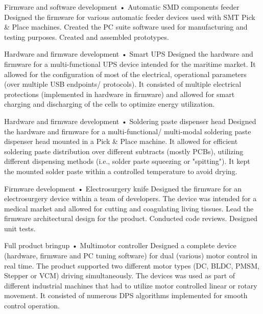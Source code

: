 \documentclass{tccv}
\begin{document}
\begin{yearlist}

\item[Firmware and software development]{•}
     {Automatic SMD components feeder}
     {Designed the firmware for various automatic feeder devices used with SMT Pick \& Place machines. Created the PC suite software used for manufacturing and testing purposes. Created and assembled prototypes.}
     
\item[Hardware and firmware development]{•}
     {Smart UPS}
     {Designed the hardware and firmware for a multi-functional UPS device intended for the maritime market. It allowed for the configuration of most of the electrical, operational parameters (over multiple USB endpoints/ protocols). It consisted of multiple electrical protections (implemented in hardware in firmware) and allowed for smart charging and discharging of the cells to optimize energy utilization.}
     
\item[Hardware and firmware development]{•}
     {Soldering paste dispenser head}
     {Designed the hardware and firmware for a multi-functional/ multi-modal soldering paste dispenser head mounted in a Pick \& Place machine. It allowed for efficient soldering paste distribution over different subtracts (mostly PCBs), utilizing different dispensing methods (i.e., solder paste squeezing or "spitting"). It kept the mounted solder paste within a controlled temperature to avoid drying.}
     
\item[Firmware development]{•}
     {Electrosurgery knife}
     {Designed the firmware for an electrosurgery device within a team of developers. The device was intended for a medical market and allowed for cutting and coagulating living tissues. Lead the firmware architectural design for the product. Conducted code reviews. Designed unit tests.}     
     
\item[Full product bringup]{•}
     {Multimotor controller}
     {Designed a complete device (hardware, firmware and PC tuning software) for dual (various) motor control in real time. The product supported two different motor types (DC, BLDC, PMSM, Stepper  or VCM) driving simultaneously. The devices was used as part of different industrial machines that had to utilize motor controlled linear or rotary movement. It consisted of numerous DPS algorithms implemented for smooth control operation.}  
     

\end{yearlist}
\end{document}
